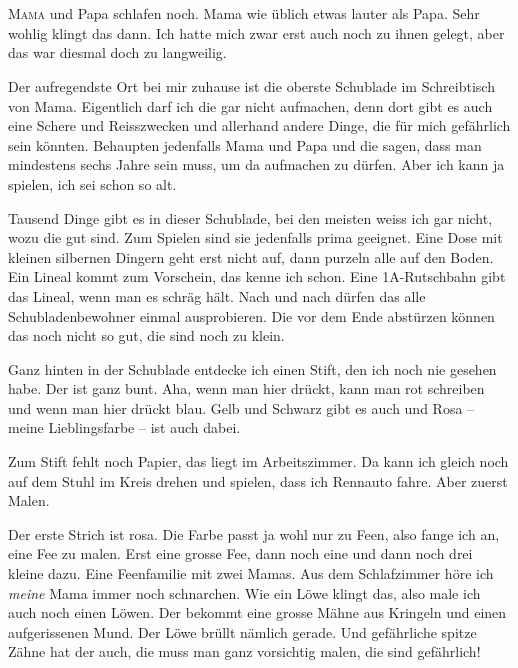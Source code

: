 \chapter*{}
\lettrine[lines=3]{\color{red}M}{ama} und Papa schlafen noch. Mama wie üblich etwas lauter als Papa.  Sehr wohlig klingt das dann. Ich hatte mich zwar erst auch noch zu ihnen gelegt, aber das war diesmal doch zu langweilig. 

Der aufregendste Ort bei mir zuhause ist die oberste Schublade im Schreibtisch von Mama. Eigentlich darf ich die gar nicht aufmachen, denn dort gibt es auch eine Schere und Reisszwecken und allerhand andere Dinge, die für mich gefährlich sein könnten. Behaupten jedenfalls Mama und Papa und die sagen, dass man mindestens sechs Jahre sein muss, um da aufmachen zu dürfen. Aber ich kann ja spielen, ich sei schon so alt. 

Tausend Dinge gibt es in dieser Schublade, bei den meisten weiss ich gar nicht, wozu die gut sind. Zum Spielen sind sie jedenfalls prima geeignet. Eine Dose mit kleinen silbernen Dingern geht erst nicht auf, dann purzeln alle auf den Boden. Ein Lineal kommt zum Vorschein, das kenne ich schon. Eine 1A-Rutschbahn gibt das Lineal, wenn man es schräg hält. Nach und nach dürfen das alle Schubladenbewohner einmal ausprobieren. Die vor dem Ende abstürzen können das noch nicht so gut, die sind noch zu klein. 

Ganz hinten in der Schublade entdecke ich einen Stift, den ich noch nie gesehen habe. Der ist ganz bunt. Aha, wenn man hier drückt, kann man rot schreiben und wenn man hier drückt blau. Gelb und Schwarz gibt es auch und Rosa -- meine Lieblingsfarbe -- ist auch dabei.

Zum Stift fehlt noch Papier, das liegt im Arbeitszimmer. Da kann ich gleich noch auf dem Stuhl im Kreis drehen und spielen, dass ich Rennauto fahre. Aber zuerst Malen. 

Der erste Strich ist rosa. Die Farbe passt ja wohl nur zu Feen, also fange ich an, eine Fee zu malen. Erst eine grosse Fee, dann noch eine und dann noch drei kleine dazu. Eine Feenfamilie mit zwei Mamas. Aus dem Schlafzimmer höre ich \emph{meine} Mama immer noch schnarchen. Wie ein Löwe klingt das, also male ich auch noch einen Löwen. Der bekommt eine grosse Mähne aus Kringeln und einen aufgerissenen Mund. Der Löwe brüllt nämlich gerade. Und gefährliche spitze Zähne hat der auch, die muss man ganz vorsichtig malen, die sind gefährlich!

